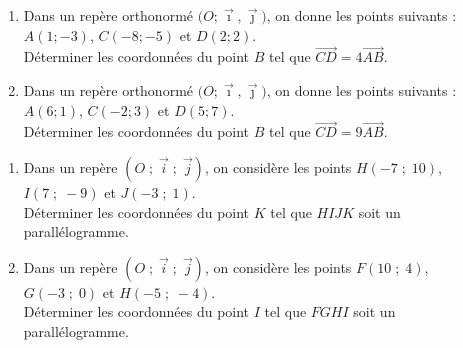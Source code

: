 \documentclass[11pt]{article}
\begin{document}
\begin{comment}
\begin{exercice}[1]

\begin{enumerate}[itemsep=1em]
\item Dans un repère orthonormé $\big(O ; \vec \imath,\vec \jmath\big)$, on donne les points $A(8\,;\,3)$, $C(-1\,;\,-8)$, $D(-3\,;\,7)$ et le vecteur $\vec{u}\begin{pmatrix}3\\3\end{pmatrix}$.\\Déterminer les coordonnées du point $B$ tel que $\overrightarrow{u}=\overrightarrow{AB}+\overrightarrow{CD}$.
\item Dans un repère orthonormé $\big(O ; \vec \imath,\vec \jmath\big)$, on donne les points $A(-5\,;\,-4)$, $C(-6\,;\,-7)$, $D(4\,;\,1)$ et le vecteur $\vec{u}\begin{pmatrix}-8\\-6\end{pmatrix}$.\\Déterminer les coordonnées du point $B$ tel que $\overrightarrow{u}=\overrightarrow{AB}+\overrightarrow{CD}$.
\end{enumerate}
\end{exercice}
\end{comment}
\begin{exercice}[1]

\begin{enumerate}[itemsep=1em]
\item Dans un repère orthonormé $\big(O ; \vec \imath,\vec \jmath\big)$, on donne les points suivants : $A(1;-3)$, $C(-8;-5)$ et $D(2;2)$.\\Déterminer les coordonnées du point $B$ tel que $\overrightarrow{CD}=4\overrightarrow{AB}$.
\item Dans un repère orthonormé $\big(O ; \vec \imath,\vec \jmath\big)$, on donne les points suivants : $A(6;1)$, $C(-2;3)$ et $D(5;7)$.\\Déterminer les coordonnées du point $B$ tel que $\overrightarrow{CD}=9\overrightarrow{AB}$.
\end{enumerate}
\end{exercice}

\begin{exercice}[1]

\begin{enumerate}[itemsep=1em]
\item Dans un repère $(O\;;\;\vec{i}\;;\;\vec{j})$, on considère les points $H(-7\;;\;10)$, $I(7\;;\;-9)$ et $J(-3\;;\;1)$.\\Déterminer les coordonnées du point $K$ tel que $HIJK$ soit un parallélogramme.
\item Dans un repère $(O\;;\;\vec{i}\;;\;\vec{j})$, on considère les points $F(10\;;\;4)$, $G(-3\;;\;0)$ et $H(-5\;;\;-4)$.\\Déterminer les coordonnées du point $I$ tel que $FGHI$ soit un parallélogramme.
\end{enumerate}
\end{exercice}
\end{document}
